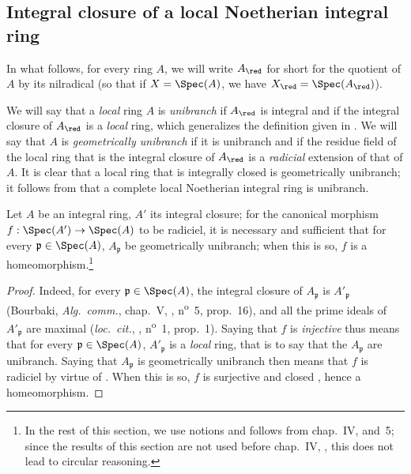 \subsection{Integral closure of a local Noetherian integral ring}
\label{subsection:0.23.2}

\begin{env}[23.2.1]
\label{0.23.2.1}
In what follows, for every ring $A$, we will write $A_\red$ for short for the quotient of $A$ by its nilradical (so that if $X=\Spec(A)$, we have $X_\red=\Spec(A_\red)$).
\end{env}

We will say that a \emph{local} ring $A$ is \emph{unibranch} if $A_\red$ is integral and if the integral closure of $A_\red$ is a \emph{local} ring, which generalizes the definition given in .
We will say that $A$ is \emph{geometrically unibranch} if it is unibranch and if the residue field of the local ring that is the integral closure of $A_\red$ is a \emph{radicial} extension of that of $A$.
It is clear that a local ring that is integrally closed is geometrically unibranch; it follows from  that a complete local Noetherian integral ring is unibranch.

\begin{lemma}[23.2.2]
\label{0.23.2.2}
Let $A$ be an integral ring, $A'$ its integral closure; for the canonical morphism $f:\Spec(A')\to\Spec(A)$ to be radiciel, it is necessary and sufficient that for every $\mathfrak{p}\in\Spec(A)$, $A_\mathfrak{p}$ be geometrically unibranch; when this is so, $f$ is a homeomorphism.\footnote{In the rest of this section, we use notions and follows from chap.~IV, \textsection{} and~5; since the results of this section are not used before chap.~IV, , this does not lead to circular reasoning.}
\end{lemma}

\begin{proof}
Indeed, for every $\mathfrak{p}\in\Spec(A)$, the integral closure of $A_\mathfrak{p}$ is $A'_\mathfrak{p}$ (Bourbaki, \emph{Alg.~comm.}, chap.~V, , n\textsuperscript{o}~5, prop.~16), and all the prime ideals of $A'_\mathfrak{p}$ are maximal (\emph{loc.~cit.}, , n\textsuperscript{o}~1, prop.~1).
Saying that $f$ is \emph{injective} thus means that for every $\mathfrak{p}\in\Spec(A)$, $A'_\mathfrak{p}$ is a \emph{local} ring, that is to say that the $A_\mathfrak{p}$ are unibranch.
Saying that $A_\mathfrak{p}$ is geometrically unibranch then means that $f$ is radiciel by virtue of .
When this is so, $f$ is surjective and closed , hence a homeomorphism.
\end{proof}

